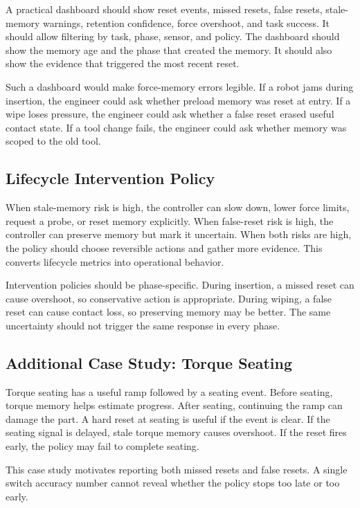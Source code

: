\documentclass{article}
\begin{document}
A practical dashboard should show reset events, missed resets, false resets,
stale-memory warnings, retention confidence, force overshoot, and task success.
It should allow filtering by task, phase, sensor, and policy. The dashboard
should show the memory age and the phase that created the memory. It should
also show the evidence that triggered the most recent reset.

Such a dashboard would make force-memory errors legible. If a robot jams during
insertion, the engineer could ask whether preload memory was reset at entry. If
a wipe loses pressure, the engineer could ask whether a false reset erased
useful contact state. If a tool change fails, the engineer could ask whether
memory was scoped to the old tool.

\subsection{Lifecycle Intervention Policy}

When stale-memory risk is high, the controller can slow down, lower force
limits, request a probe, or reset memory explicitly. When false-reset risk is
high, the controller can preserve memory but mark it uncertain. When both risks
are high, the policy should choose reversible actions and gather more evidence.
This converts lifecycle metrics into operational behavior.

Intervention policies should be phase-specific. During insertion, a missed
reset can cause overshoot, so conservative action is appropriate. During wiping,
a false reset can cause contact loss, so preserving memory may be better. The
same uncertainty should not trigger the same response in every phase.

\subsection{Additional Case Study: Torque Seating}

Torque seating has a useful ramp followed by a seating event. Before seating,
torque memory helps estimate progress. After seating, continuing the ramp can
damage the part. A hard reset at seating is useful if the event is clear. If the
seating signal is delayed, stale torque memory causes overshoot. If the reset
fires early, the policy may fail to complete seating.

This case study motivates reporting both missed resets and false resets. A
single switch accuracy number cannot reveal whether the policy stops too late
or too early.
\end{document}
